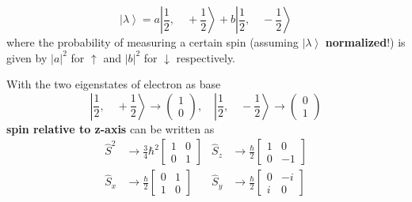 \begin{equation*}
    \left|\lambda\right>=a\left|\frac{1}{2},\quad +\frac{1}{2}\right>+b\left|\frac{1}{2},\quad -\frac{1}{2}\right>
\end{equation*}
where the probability of measuring a certain spin (assuming $\left|\lambda\right>$ \textbf{normalized}!) is given by $|a|^2$ for $\uparrow$ and $|b|^2$ for $\downarrow$ respectively.

\newpar{}

With the two eigenstates of electron as base
\begin{equation*}
    \left|\frac{1}{2},\quad +\frac{1}{2}\right> \rightarrow \left(\begin{matrix}
            1 \\
            0
        \end{matrix}\right),\quad
    \left|\frac{1}{2},\quad -\frac{1}{2}\right> \rightarrow \left(\begin{matrix}
            0 \\
            1
        \end{matrix}\right)
\end{equation*}
\textbf{spin relative to z-axis} can be written as
\begin{align*}
    \widehat{S}^2   & \rightarrow \frac{3}{4}{\hbar}^2\begin{bmatrix}
                                                          1 & 0 \\
                                                          0 & 1
                                                      \end{bmatrix} &
    \widehat{S}_{z} & \rightarrow \frac{\hbar}{2}\begin{bmatrix}
                                                     1 & 0  \\
                                                     0 & -1
                                                 \end{bmatrix}       \\
    \widehat{S}_{x} & \rightarrow \frac{\hbar}{2}\begin{bmatrix}
                                                     0 & 1 \\
                                                     1 & 0
                                                 \end{bmatrix}      &
    \widehat{S}_{y} & \rightarrow \frac{\hbar}{2}\begin{bmatrix}
                                                     0 & -i \\
                                                     i & 0
                                                 \end{bmatrix}
\end{align*}

